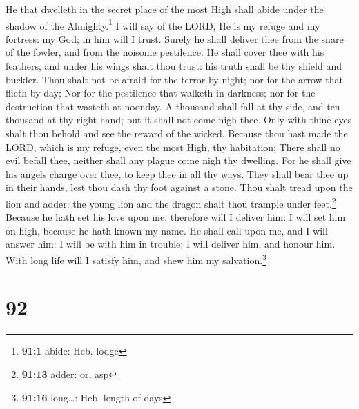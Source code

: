  He that dwelleth in the secret place of the most High
shall abide under the shadow of the Almighty.\footnote{\textbf{91:1}
  abide: Heb. lodge}  I will say of the LORD, He is my
refuge and my fortress: my God; in him will I trust. 
Surely he shall deliver thee from the snare of the fowler, and from the
noisome pestilence.  He shall cover thee with his
feathers, and under his wings shalt thou trust: his truth shall be thy
shield and buckler.  Thou shalt not be afraid for the
terror by night; nor for the arrow that flieth by day; 
Nor for the pestilence that walketh in darkness; nor for the destruction
that wasteth at noonday.  A thousand shall fall at thy
side, and ten thousand at thy right hand; but it shall not come nigh
thee.  Only with thine eyes shalt thou behold and see the
reward of the wicked.  Because thou hast made the LORD,
which is my refuge, even the most High, thy habitation; 
There shall no evil befall thee, neither shall any plague come nigh thy
dwelling.  For he shall give his angels charge over thee,
to keep thee in all thy ways.  They shall bear thee up in
their hands, lest thou dash thy foot against a stone. 
Thou shalt tread upon the lion and adder: the young lion and the dragon
shalt thou trample under feet.\footnote{\textbf{91:13} adder: or, asp}
 Because he hath set his love upon me, therefore will I
deliver him: I will set him on high, because he hath known my name.
 He shall call upon me, and I will answer him: I will be
with him in trouble; I will deliver him, and honour him. 
With long life will I satisfy him, and shew him my salvation.\footnote{\textbf{91:16}
  long\ldots: Heb. length of days}

\hypertarget{section-91}{%
\section{92}\label{section-91}}

